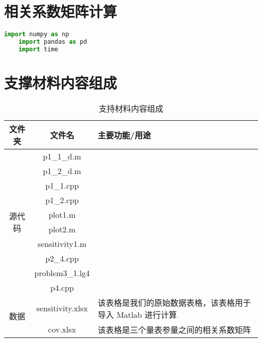 \documentclass[withoutpreface,bwprint]{cumcmthesis} %
\begin{document}
\newpage
\begin{appendices}

\section{相关系数矩阵计算}

\begin{lstlisting}[language=python]
    import numpy as np
    import pandas as pd
    import time

\end{lstlisting}

\section{支撑材料内容组成}


\begin{table}[h!]
    \centering
    \begin{tabular}{c|c|m{10cm}}
        \toprule
        \textbf{文件夹} & \textbf{文件名} & \textbf{主要功能/用途} \\
        \midrule
        \multirow{10}{*}{源代码} 
        & p1\_1\_d.m &  \\
        \cline{2-3}
        & p1\_2\_d.m &  \\
        \cline{2-3}
        & p1\_1.cpp &  \\
        \cline{2-3}
        & p1\_2.cpp &  \\
        \cline{2-3}
        & plot1.m &  \\
        \cline{2-3}
        & plot2.m &  \\
        \cline{2-3}
        & sensitivity1.m &  \\
        \cline{2-3}
        & p2\_4.cpp & \\
        \cline{2-3}
        & problem3\_1.lg4 &  \\
        \cline{2-3}
        & p4.cpp &  \\
        \midrule
        \multirow{2}{*}{数据} 
        & sensitivity.xlsx & 该表格是我们的原始数据表格，该表格用于导入 Matlab 进行计算 \\
        \cline{2-3}
        & cov.xlsx & 该表格是三个量表参量之间的相关系数矩阵 \\
        \bottomrule
    \end{tabular}
    \caption{支持材料内容组成}
    \label{tab:supporting_materials}
\end{table}

\end{appendices}
\end{document}
